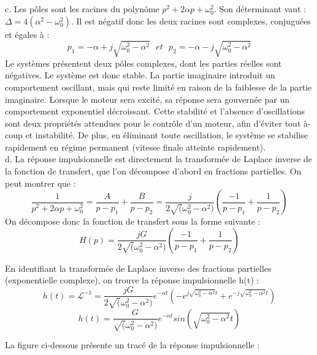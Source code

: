 \documentclass[11pt]{report}
\begin{document}
	c. Les pôles sont les racines du polynôme $p^{2}+2\alpha p+\omega_{0}^{2}$. Son déterminant vaut : $\Delta=4(\alpha^2-\omega_{0}^2)$. Il est négatif donc les deux racines sont complexes, conjuguées et égales à :
	\begin{equation*}
	p_1 =-\alpha+j\sqrt{\omega_{0}^2-\alpha^2}~~~et~~~	p_2 =-\alpha-j\sqrt{\omega_{0}^2-\alpha^2}
	\end{equation*}
	Le systèmes présentent deux pôles complexes, dont les parties réelles sont négatives. Le système est donc stable. La partie imaginaire introduit un comportement oscillant, mais qui reste limité en raison de la faiblesse de la partie imaginaire. Lorsque le moteur sera excité, sa réponse sera gouvernée par un comportement exponentiel décroissant. Cette stabilité et l'absence d'oscillations sont deux propriétés attendues pour le contrôle d'un moteur, afin d'éviter tout à-coup et instabilité. De plus, en éliminant toute oscillation, le système se stabilise rapidement en régime permanent (vitesse finale atteinte rapidement).\\ 
	
	d. La réponse impulsionnelle est directement la transformée de Laplace inverse de la fonction de transfert, que l'on décompose d'abord en fractions partielles. On peut montrer que :
	\begin{equation*}
	\frac{1}{p^{2}+2\alpha p+\omega_{0}^{2}}=\frac{A}{p-p_1}+\frac{B}{p-p_2}=\frac{j}{2\sqrt(\omega_{0}^2-\alpha^2)}(\frac{-1}{p-p_1}+\frac{1}{p-p_2})
	\end{equation*}
	On décompose donc la fonction de transfert sous la forme suivante :
	\begin{equation*}
	H(p)=\frac{jG}{2\sqrt(\omega_{0}^2-\alpha^2)}(\frac{-1}{p-p_1}+\frac{1}{p-p_2})
	\end{equation*}
	
	En identifiant la transformée de Laplace inverse des fractions partielles (exponentielle complexe), on trouve la réponse impulsionnelle h(t) :
	\begin{equation*}
	h(t)=\mathcal{L}^{-1}=\frac{jG}{2\sqrt(\omega_{0}^2-\alpha^2)}e^{-\alpha t}(-e^{j\sqrt{\omega_{0}^2-\alpha^2}t}+e^{-j\sqrt{\omega_{0}^2-\alpha^2}t})
	\end{equation*}
	\begin{equation*}
	h(t)=\frac{G}{\sqrt(\omega_{0}^2-\alpha^2)}e^{-\alpha t}sin(\sqrt{\omega_{0}^2-\alpha^2}t)
	\end{equation*}
	
	La figure ci-dessous présente un tracé de la réponse impulsionnelle :
	
\end{document}
